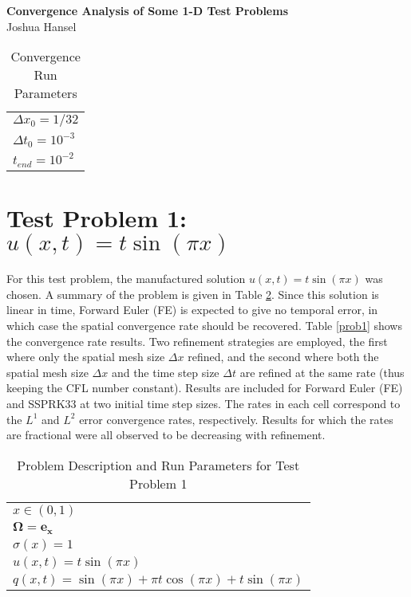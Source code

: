 \documentclass{report}
\begin{document}
\begin{center}
   \Large\textbf{Convergence Analysis of Some 1-D Test Problems}\\
   \large Joshua Hansel
\end{center}
\vspace{2em}

\begin{table}[H]\caption{\label{runparams}Convergence Run Parameters}
\begin{center}
\begin{tabular}{l}\hline\hline
$\Delta x_0 = 1/32$ \\
$\Delta t_0 = 10^{-3}$ \\
$t_{end} = 10^{-2}$ \\\hline\hline
\end{tabular}
\end{center}
\end{table}

\section{Test Problem 1: $u(x,t) = t\sin(\pi x)$}

For this test problem, the manufactured solution $u(x,t) = t\sin(\pi x)$
was chosen. A summary of the problem is given in Table \ref{prob1params}.
Since this solution is linear in time, Forward Euler (FE) is expected
to give no temporal error, in which case the spatial convergence rate should be
recovered. Table \ref{prob1} shows the convergence rate results. Two refinement
strategies are employed, the first where only the spatial mesh size $\Delta x$ refined, and
the second where both the spatial mesh size $\Delta x$ and the time step size $\Delta t$
are refined at the same rate (thus keeping the CFL number constant). Results are included
for Forward Euler (FE) and SSPRK33 at two initial time step sizes. The rates in each cell
correspond to the $L^1$ and $L^2$ error convergence rates, respectively. Results for which
the rates are fractional were all observed to be decreasing with refinement.

\begin{table}[H]\caption{\label{prob1params}Problem Description and Run Parameters for Test Problem 1}
\begin{center}
\begin{tabular}{l}\hline\hline
$x\in(0,1)$ \\
$\mathbf{\Omega} = \mathbf{e_x}$ \\
$\sigma(x) = 1$ \\
$u(x,t) = t\sin(\pi x)$ \\
$q(x,t) = \sin(\pi x) + \pi t\cos(\pi x) + t\sin(\pi x)$ \\\hline\hline
\end{tabular}
\end{center}
\end{table}
\end{document}

